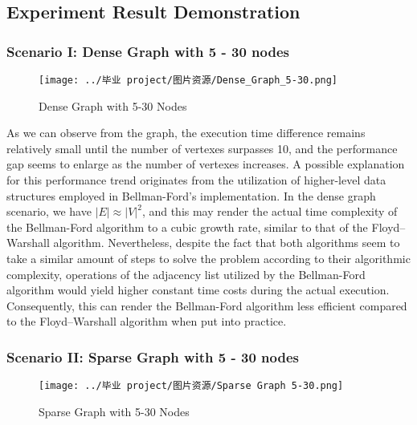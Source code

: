\documentclass[12pt]{article}
\begin{document}
\subsection{Experiment Result Demonstration}
\subsubsection{Scenario I: Dense Graph with 5 - 30 nodes}

\begin{figure}[H]
    \renewcommand{\figurename}{Fig} %
    \centering
    \texttt{[image: ../毕业 project/图片资源/Dense\_Graph\_5-30.png]}

    \caption{Dense Graph with 5-30 Nodes}
    \end{figure}
As we can observe from the graph, the execution time difference remains relatively small until the number of vertexes surpasses 10, and the performance gap seems to enlarge as the number of vertexes increases. A possible explanation for this performance trend originates from the utilization of higher-level data structures employed in Bellman-Ford's implementation. In the dense graph scenario, we have $|E| \approx |V|^2$, and this may render the actual time complexity of the Bellman-Ford algorithm to a cubic growth rate, similar to that of the Floyd–Warshall algorithm. Nevertheless, despite the fact that both algorithms seem to take a similar amount of steps to solve the problem according to their algorithmic complexity, operations of the adjacency list utilized by the Bellman-Ford algorithm would yield higher constant time costs during the actual execution. Consequently, this can render the Bellman-Ford algorithm less efficient compared to the Floyd–Warshall algorithm when put into practice.

\subsubsection{Scenario II: Sparse Graph with 5 - 30 nodes}

\begin{figure}[H]
    \renewcommand{\figurename}{Fig} %
    \centering
    \texttt{[image: ../毕业 project/图片资源/Sparse Graph 5-30.png]}

    \caption{Sparse Graph with 5-30 Nodes}
    \end{figure}
\end{document}
